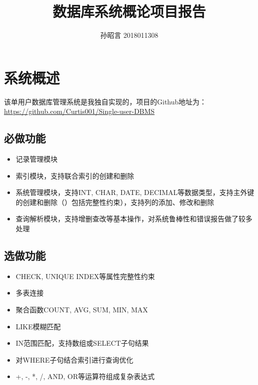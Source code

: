 \documentclass[11pt,UTF8]{report}
\title{数据库系统概论项目报告}
\author{孙昭言 2018011308}
\begin{document}
	\maketitle
	
	\section{系统概述}
	该单用户数据库管理系统是我独自实现的，项目的Github地址为：\url{https://github.com/Curtis001/Single-user-DBMS}
	\subsection{必做功能}
	\begin{itemize}
		\item 记录管理模块
		\item 索引模块，支持联合索引的创建和删除
		\item 系统管理模块，支持INT, CHAR, DATE, DECIMAL等数据类型，支持主外键的创建和删除（）包括完整性约束），支持列的添加、修改和删除
		\item 查询解析模块，支持增删查改等基本操作，对系统鲁棒性和错误报告做了较多处理
	\end{itemize}
	
	\subsection{选做功能}
	\begin{itemize}
		\item CHECK, UNIQUE INDEX等属性完整性约束
		\item 多表连接
		\item 聚合函数COUNT, AVG, SUM, MIN, MAX
		\item LIKE模糊匹配
		\item IN范围匹配，支持数组或SELECT子句结果
		\item 对WHERE子句结合索引进行查询优化
		\item +, -, *, /, AND, OR等运算符组成复杂表达式
	\end{itemize}
	
\end{document}
